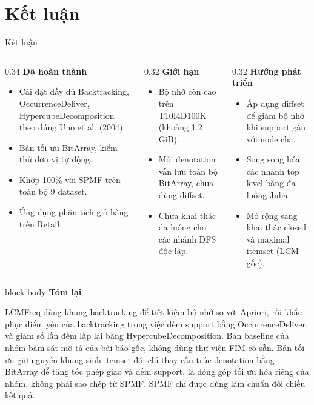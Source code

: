 \documentclass[9pt, aspectratio=169]{beamer}
\newenvironment{quietblock}[1]{%
  \begin{beamercolorbox}[wd=\linewidth,sep=5pt,rounded=true]{block body}
  {\color{psdearblue}\bfseries #1}\par\vspace{2pt}\footnotesize
}{%
  \end{beamercolorbox}
}
\begin{document}
\section{Kết luận}
\begin{frame}{Kết luận}
  \begin{columns}[T,onlytextwidth]
    \begin{column}{0.34\textwidth}
      \small
      \textbf{Đã hoàn thành}
      \begin{itemize}
        \item Cài đặt đầy đủ Backtracking, OccurrenceDeliver,
          HypercubeDecomposition theo đúng Uno et al. (2004).
        \item Bản tối ưu BitArray, kiểm thử đơn vị tự động.
        \item Khớp 100\% với SPMF trên toàn bộ 9 dataset.
        \item Ứng dụng phân tích giỏ hàng trên Retail.
      \end{itemize}
    \end{column}
    \begin{column}{0.32\textwidth}
      \small
      \textbf{Giới hạn}
      \begin{itemize}
        \item Bộ nhớ còn cao trên T10I4D100K (khoảng 1.2 GiB).
        \item Mỗi denotation vẫn lưu toàn bộ BitArray, chưa dùng diffset.
        \item Chưa khai thác đa luồng cho các nhánh DFS độc lập.
      \end{itemize}
    \end{column}
    \begin{column}{0.32\textwidth}
      \small
      \textbf{Hướng phát triển}
      \begin{itemize}
        \item Áp dụng diffset để giảm bộ nhớ khi support gần với node cha.
        \item Song song hóa các nhánh top level bằng đa luồng Julia.
        \item Mở rộng sang khai thác closed và maximal itemset (LCM gốc).
      \end{itemize}
    \end{column}
  \end{columns}

  \vspace{0.25cm}
  \begin{quietblock}{Tóm lại}
    LCMFreq dùng khung backtracking để tiết kiệm bộ nhớ so với Apriori, rồi
    khắc phục điểm yếu của backtracking trong việc đếm support bằng
    OccurrenceDeliver, và giảm số lần đếm lặp lại bằng HypercubeDecomposition.
    Bản baseline của nhóm bám sát mô tả của bài báo gốc, không dùng thư
    viện FIM có sẵn. Bản tối ưu giữ nguyên khung sinh itemset đó, chỉ thay
    cấu trúc denotation bằng BitArray để tăng tốc phép giao và đếm support,
    là đóng góp tối ưu hóa riêng của nhóm, không phải sao chép từ SPMF. SPMF
    chỉ được dùng làm chuẩn đối chiếu kết quả.
  \end{quietblock}
\end{frame}
\end{document}
